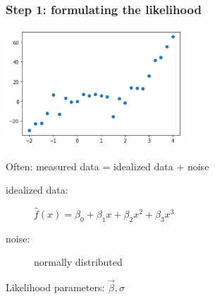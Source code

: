 \documentclass[t,aspectratio=169]{beamer}
\begin{document}
\begin{frame}
  \frametitle{Step 1: formulating the likelihood}
  \begin{center}
    \includegraphics[width=0.5\textwidth]{images/polyfit_data.png}
  \end{center}
  Often: measured data = idealized data + noise\\
  \bigskip
  \begin{description}
  \item[idealized data:] $\hat f(x)=\beta_0 + \beta_1x + \beta_2x^2 + \beta_3x^3$
  \item[\phantom{zed data}noise:] normally distributed
  \end{description}
  Likelihood parameters: $\vec{\beta},\sigma$
\end{frame}

\newcommand{\shrug}[1][]{%
\begin{tikzpicture}[baseline,x=0.8\ht\strutbox,y=0.8\ht\strutbox,line width=0.125ex,#1]
\def\arm{(-2.5,0.95) to (-2,0.95) (-1.9,1) to (-1.5,0) (-1.35,0) to (-0.8,0)};
\draw \arm;
\draw[xscale=-1] \arm;
\def\headpart{(0.6,0) arc[start angle=-40, end angle=40,x radius=0.6,y radius=0.8]};
\draw \headpart;
\draw[xscale=-1] \headpart;
\def\eye{(-0.075,0.15) .. controls (0.02,0) .. (0.075,-0.15)};
\draw[shift={(-0.3,0.8)}] \eye;
\draw[shift={(0,0.85)}] \eye;
\draw (-0.1,0.2) to [out=15,in=-100] (0.4,0.95); 
\end{tikzpicture}}
\end{document}
